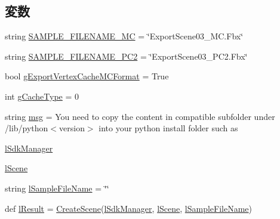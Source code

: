 \subsection*{変数}
\begin{DoxyCompactItemize}
\item 
string \hyperlink{namespace_export_scene03_a7cc71f386a55d501ed9f0b5cc18d689f}{S\+A\+M\+P\+L\+E\+\_\+\+F\+I\+L\+E\+N\+A\+M\+E\+\_\+\+MC} = \char`\"{}Export\+Scene03\+\_\+\+M\+C.\+Fbx\char`\"{}
\item 
string \hyperlink{namespace_export_scene03_abc5f42710746b550d1456c48931f5fe8}{S\+A\+M\+P\+L\+E\+\_\+\+F\+I\+L\+E\+N\+A\+M\+E\+\_\+\+P\+C2} = \char`\"{}Export\+Scene03\+\_\+\+P\+C2.\+Fbx\char`\"{}
\item 
bool \hyperlink{namespace_export_scene03_ac1d6ad6ededc994850fc6db74da83f2e}{g\+Export\+Vertex\+Cache\+M\+C\+Format} = True
\item 
int \hyperlink{namespace_export_scene03_ab1de8b16f4301982b9a07c1ecff11b96}{g\+Cache\+Type} = 0
\item 
string \hyperlink{namespace_export_scene03_a55cdf551f402e4e0c25e1f6fe2034ed5}{msg} = \textquotesingle{}You need to copy the content in compatible subfolder under /lib/python$<$version$>$ into your python install folder such as \textquotesingle{}
\item 
\hyperlink{namespace_export_scene03_a751884e99add0b4ff56fff13fcb5bfc1}{l\+Sdk\+Manager}
\item 
\hyperlink{namespace_export_scene03_ad8bf21b37e00bbb2a8fb1c674fd7cbf3}{l\+Scene}
\item 
string \hyperlink{namespace_export_scene03_a973ac823f65e638f810a9703775460d1}{l\+Sample\+File\+Name} = \char`\"{}\char`\"{}
\item 
def \hyperlink{namespace_export_scene03_a229ae26a2a24e3aa4b6bc75fbcce3c10}{l\+Result} = \hyperlink{namespace_export_scene03_a046d5e67dee0735f097817fd9f265d98}{Create\+Scene}(\hyperlink{namespace_export_scene03_a751884e99add0b4ff56fff13fcb5bfc1}{l\+Sdk\+Manager}, \hyperlink{namespace_export_scene03_ad8bf21b37e00bbb2a8fb1c674fd7cbf3}{l\+Scene}, \hyperlink{namespace_export_scene03_a973ac823f65e638f810a9703775460d1}{l\+Sample\+File\+Name})
\end{DoxyCompactItemize}


